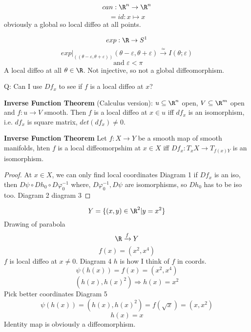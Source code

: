 \begin{example}
  $$can: \R^n \to \R^n$$
  $$=id: x \mapsto x$$
  obviously a global so local diffeo at all points.
\end{example}
\begin{example}
  $$exp: \R \to S^1$$
  $$exp\rvert_{((\theta-\varepsilon,\theta+\varepsilon))}(\theta-\varepsilon,\theta+\varepsilon) \xrightarrow{\simeq}I(\theta;\varepsilon)$$
  $$\text{ and } \varepsilon<\pi$$
  A local diffeo at all $\theta\in \R$. Not injective, so not a global diffeomorphism.
\end{example}

Q: Can I use $Df_x$ to see if $f$ is a local diffeo at $x$?
\begin{theorem}
  \textbf{Inverse Function Theorem}
  \newline (Calculus version): $u \subseteq \R^n $ open, $V \subseteq \R^m$ open and
    $f: u \to V$  smooth. Then $f$ is a local diffeo at $x\in u$ iff $df_x$ is an isomorphism, i.e. $df_x$ is square matrix, $det(df_x)\neq 0$.
\end{theorem}

\begin{theorem}
  \textbf{Inverse Function Theorem}
  \newline  Let $f: X \to Y$ be a smooth map of smooth manifolds, hten $f$ is a local diffeomorpshim at $x\in X$ iff $Df_x:T_xX\to T_{f(x)Y}$ is an isomorphism.
\end{theorem}
\begin{proof}
  At $x\in X$, we can only find local coordinates
  \newline Diagram 1
  \newline if $Df_x$ is an iso, then $D\psi \circ Dh_0 \circ D\varphi_0 ^{-1}$ where, $D\varphi_0 ^{-1},D\psi$ are isomorphisms, so $Dh_0$ has to be iso too.
  \newline Diagram 2
  \newline diagram 3
  \qedhere
\end{proof}

\begin{example}
  $$Y=\{(x,y)\in \R^2 | y=x^2\}$$
  Drawing of parabola
  $$\R \xrightarrow{f}Y$$
  $$f(x)=(x^2,x^4)$$
  $f$ is local diffeo at $x\neq 0$.
  \newline Diagram 4
  \newline $h$ is how I think of $f$ in coords.
    $$\psi(h(x))=f(x)=(x^2,x^4)$$
    $$\left(h(x),h(x)^2\right) \Rightarrow h(x)=x^2$$
    Pick better coordinates
    \newline Diagram 5
      $$\psi(h(x))=\left(h(x),h(x)^2\right)=f(\sqrt{x})=\left(x,x^2\right)$$
      $$h(x)=x$$
      Identity map is obviously a diffeomorphism.
\end{example}

